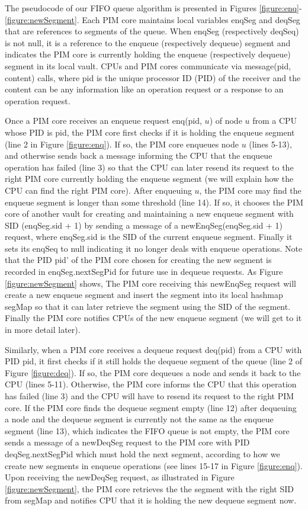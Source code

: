 \documentclass[11pt, letterpaper]{article}   	%
\begin{document}
The pseudocode of our FIFO queue algorithm is presented in Figures \ref{figure:enq}-\ref{figure:newSegment}.
Each PIM core maintains local variables enqSeg and deqSeg that are references to segments of the queue.
When enqSeg (respectively deqSeq) is not null,
it is a reference to the enqueue (respectively dequeue) segment and indicates
the PIM core is currently holding the enqueue (respectively dequeue) segment in its local vault.
CPUs and PIM cores communicate via message(pid, content) calls, where pid is the unique processor ID (PID) of 
the receiver and the content can be any information like an operation request or a response to an operation request.

Once a PIM core receives an enqueue request enq(pid, $u$) of node $u$ from a CPU whose PID is pid,
the PIM core first checks if it is holding the enqueue segment (line 2 in Figure \ref{figure:enq}).
If so, the PIM core enqueues node $u$ (lines 5-13), and otherwise sends back a message
informing the CPU that the enqueue operation has failed (line 3) so that
the CPU can later resend its request to the right PIM core currently holding the enqueue segment
(we will explain how the CPU can find the right PIM core).
After enqueuing $u$, the PIM core may find the enqueue segment is longer than some threshold (line 14).
If so, it chooses the PIM core of another vault for creating and maintaining a new enqueue segment 
with SID (enqSeg.sid + 1) by sending a message of a newEnqSeg(enqSeg.sid + 1) request, 
where enqSeg.sid is the SID of the current enqueue segment.
Finally it sets its enqSeq to null indicating it no longer deals with enqueue operations.
Note that the PID pid' of the PIM core chosen for creating the new segment is recorded in 
enqSeg.nextSegPid for future use in dequeue requests.
As Figure \ref{figure:newSegment} shows,
The PIM core receiving this newEnqSeg request will create a new enqueue segment and insert the segment
into its local hashmap segMap so that it can later retrieve the segment using the SID of the segment.
Finally the PIM core notifies CPUs of the new enqueue segment (we will get to it in more detail later).

Similarly, when a PIM core receives a dequeue request deq(pid) from a CPU with PID pid,
it first checks if it still holds the dequeue segment of the queue (line 2 of Figure \ref{figure:deq}).
If so, the PIM core dequeues a node and sends it back to the CPU (lines 5-11).
Otherwise, the PIM core informs the CPU that this operation has failed (line 3) and
the CPU will have to resend its request to the right PIM core.
If the PIM core finds the dequeue segment empty (line 12) after dequeuing a node 
and the dequeue segment is currently not the same as the enqueue segment (line 13),
which indicates the FIFO queue is not empty,
the PIM core sends a message of a newDeqSeg request to the PIM core with PID deqSeg.nextSegPid 
which must hold the next segment, according to how we create new segments in enqueue operations
(see lines 15-17 in Figure \ref{figure:enq}). 
Upon receiving the newDeqSeg request, as illustrated in Figure \ref{figure:newSegment}, 
the PIM core retrieves the the segment with the right SID from segMap and 
notifies CPU that it is holding the new dequeue segment now.
\end{document}

